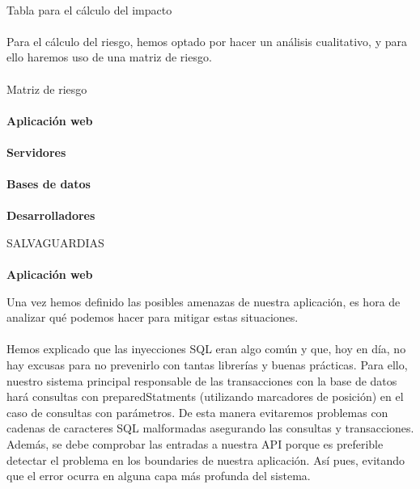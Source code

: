 \paragraph{}
Tabla para el cálculo del impacto
\paragraph{}
Para el cálculo del riesgo, hemos optado por hacer un análisis
cualitativo, y para ello haremos uso de una matriz de riesgo.
\paragraph{}
Matriz de riesgo 
\paragraph{}
\textbf{Aplicación web}
\paragraph{}
\textbf{Servidores}
\paragraph{}
\textbf{Bases de datos}
\paragraph{}
\textbf{Desarrolladores}

SALVAGUARDIAS
\paragraph{}
\textbf{Aplicación web}

Una vez hemos definido las posibles amenazas de nuestra aplicación, es
hora de analizar qué podemos hacer para mitigar estas situaciones.
\paragraph{}
Hemos explicado que las inyecciones SQL eran algo común y que, hoy en
día, no hay excusas para no prevenirlo con tantas librerías y buenas
prácticas. Para ello, nuestro sistema principal responsable de las
transacciones con la base de datos hará consultas con
preparedStatments (utilizando marcadores de posición) en el caso de
consultas con parámetros. De esta manera evitaremos problemas con
cadenas de caracteres SQL malformadas asegurando las consultas y
transacciones. Además, se debe comprobar las entradas a nuestra API
porque es preferible detectar el problema en los boundaries de nuestra
aplicación. Así pues, evitando que el error ocurra en alguna capa más
profunda del sistema.

